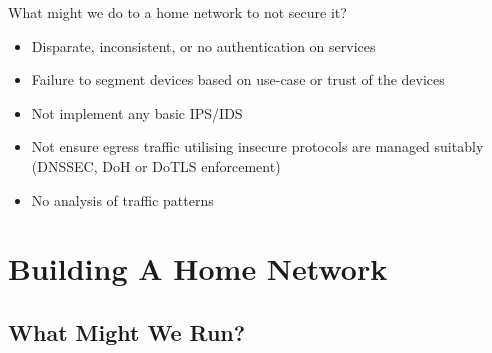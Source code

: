 \documentclass{beamer}
\begin{document}
\begin{frame}
    \begin{center}
        What might we do to a home network to not secure it?
    \end{center}
\end{frame}

\begin{frame}
    \begin{itemize}
        \item Disparate, inconsistent, or no authentication on services
        \item Failure to segment devices based on use-case or trust of the devices
        \item Not implement any basic IPS/IDS
        \item Not ensure egress traffic utilising insecure protocols are managed suitably (DNSSEC, DoH or DoTLS enforcement)
        \item No analysis of traffic patterns
    \end{itemize}
\end{frame}

\section{Building A Home Network}
\subsection{What Might We Run?}
\end{document}
